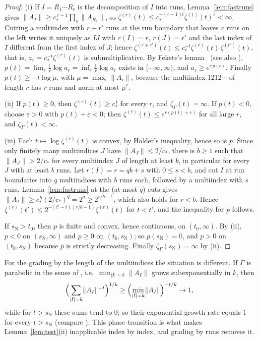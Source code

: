 \documentclass[11pt]{amsart}
\theoremstyle{definition}
\theoremstyle{remark}
\newcommand{\sN}{s_{\mathrm N}}
\newcommand{\abs}[1]{\lvert #1\rvert}
\newcommand{\norm}[1]{\lVert #1\rVert}
\begin{document}
\begin{proof}
(i) If $I=R_1\cdots R_r$ is the decomposition of $I$ into runs, Lemma~\ref{lem:fastruns}
gives $\norm{A_I}\ge c_*^{\,r-1}\prod_s\norm{A_{R_s}}$, so
$\zeta^{(r)}(t)\le c_*^{-(r-1)t}\zeta^{(1)}(t)^r<\infty$. Cutting a multiindex with $r+r'$ runs
at the run boundary that leaves $r$ runs on the left writes it uniquely as $IJ$ with $r(I)=r$, $r(J)=r'$ and the
last index of $I$ different from the first index of $J$; hence
$\zeta^{(r+r')}(t)\le c_*^{-t}\zeta^{(r)}(t)\,\zeta^{(r')}(t)$, that is,
$a_r=c_*^{-t}\zeta^{(r)}(t)$ is submultiplicative. By Fekete's lemma~\cite{Fek23} (see also \cite[Part~I, Problem~98]{PS98}),
$p(t)=\lim_r\frac1r\log a_r=\inf_r\frac1r\log a_r$ exists in $[-\infty,\infty)$,
and $a_r\ge e^{r\,p(t)}$. Finally $p(t)\ge-t\log\mu$, with $\mu=\max_i\norm{A_i}$,
because the multiindex $1212\cdots$ of length $r$ has $r$ runs and norm at most $\mu^r$.

(ii) If $p(t)\ge0$, then $\zeta^{(r)}(t)\ge c_*^{\,t}$ for every $r$, and $\zeta_\Gamma(t)=\infty$.
If $p(t)<0$, choose $\varepsilon>0$ with $p(t)+\varepsilon<0$; then
$\zeta^{(r)}(t)\le e^{r(p(t)+\varepsilon)}$ for all large $r$, and $\zeta_\Gamma(t)<\infty$.

(iii) Each $t\mapsto\log\zeta^{(r)}(t)$ is convex, by H\"older's inequality, hence so is
$p$. Since only finitely many multiindices $J$ have $\norm{A_J}\le2/c_*$, there is $b\ge1$ such that
$\norm{A_J}>2/c_*$ for every multiindex $J$ of length at least $b$, in particular for
every $J$ with at least $b$ runs. Let $r(I)=r=qb+s$ with $0\le s<b$, and cut $I$
at run boundaries into $q$ multiindices with $b$ runs each, followed by a multiindex with $s$
runs. Lemma~\ref{lem:fastruns} at the (at most $q$) cuts gives
$\norm{A_I}\ge c_*^{\,q}(2/c_*)^q=2^q\ge2^{r/b-1}$, which also holds for $r<b$.
Hence $\zeta^{(r)}(t')\le2^{-(t'-t)(r/b-1)}\zeta^{(r)}(t)$ for $t<t'$, and the inequality
for $p$ follows.

If $\sN>t_0$, then $p$ is finite and convex, hence continuous, on $(t_0,\infty)$.
By (ii), $p<0$ on $(\sN,\infty)$ and $p\ge0$ on $(t_0,\sN)$; so $p(\sN)=0$, and
$p>0$ on $(t_0,\sN)$ because $p$ is strictly decreasing. Finally $\zeta_\Gamma(\sN)=\infty$
by (ii).
\end{proof}

For the grading by the length of the multiindices the situation is different. If $\Gamma$ is parabolic
in the sense of \cite[Def.~1]{DL15JGA}, i.e.\ $\min_{\abs I=k}\norm{A_I}$ grows
subexponentially in $k$, then
\[
  \Bigl(\sum_{\abs I=k}\norm{A_I}^{-t}\Bigr)^{1/k}\ge\Bigl(\min_{\abs I=k}\norm{A_I}\Bigr)^{-t/k}\to1,
\]
while for $t>\sN$ these sums tend to $0$; so their exponential growth rate equals
$1$ for every $t>\sN$ (compare \cite[Thm.~2]{DL15JGA}). This phase transition is
what makes Lemma~\ref{lem:test}(ii) inapplicable index by index, and grading by
runs removes it.
\end{document}
